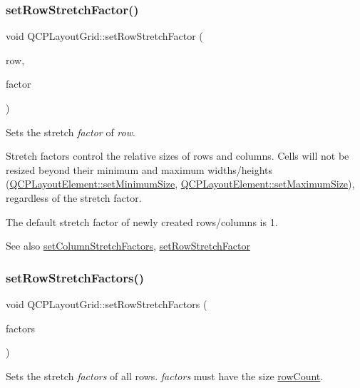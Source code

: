 \subsubsection{\texorpdfstring{set\+Row\+Stretch\+Factor()}{setRowStretchFactor()}}
{\footnotesize\ttfamily void Q\+C\+P\+Layout\+Grid\+::set\+Row\+Stretch\+Factor (\begin{DoxyParamCaption}\item[{int}]{row,  }\item[{double}]{factor }\end{DoxyParamCaption})}

Sets the stretch {\itshape factor} of {\itshape row}.

Stretch factors control the relative sizes of rows and columns. Cells will not be resized beyond their minimum and maximum widths/heights (\mbox{\hyperlink{class_q_c_p_layout_element_a5dd29a3c8bc88440c97c06b67be7886b}{Q\+C\+P\+Layout\+Element\+::set\+Minimum\+Size}}, \mbox{\hyperlink{class_q_c_p_layout_element_a74eb5280a737ab44833d506db65efd95}{Q\+C\+P\+Layout\+Element\+::set\+Maximum\+Size}}), regardless of the stretch factor.

The default stretch factor of newly created rows/columns is 1.

\begin{DoxySeeAlso}{See also}
\mbox{\hyperlink{class_q_c_p_layout_grid_a6c2591d1a7e2534ce036989543b49e57}{set\+Column\+Stretch\+Factors}}, \mbox{\hyperlink{class_q_c_p_layout_grid_a7b0273de5369bd93d942edbaf5b166ec}{set\+Row\+Stretch\+Factor}} 
\end{DoxySeeAlso}
\mbox{\label{class_q_c_p_layout_grid_a200b45f9c908f96ebadaa3c8d87a2782}} 
\subsubsection{\texorpdfstring{set\+Row\+Stretch\+Factors()}{setRowStretchFactors()}}
{\footnotesize\ttfamily void Q\+C\+P\+Layout\+Grid\+::set\+Row\+Stretch\+Factors (\begin{DoxyParamCaption}\item[{const Q\+List$<$ double $>$ \&}]{factors }\end{DoxyParamCaption})}

Sets the stretch {\itshape factors} of all rows. {\itshape factors} must have the size \mbox{\hyperlink{class_q_c_p_layout_grid_a19c66fd76cbce58a8e94f33797e0c0aa}{row\+Count}}.

